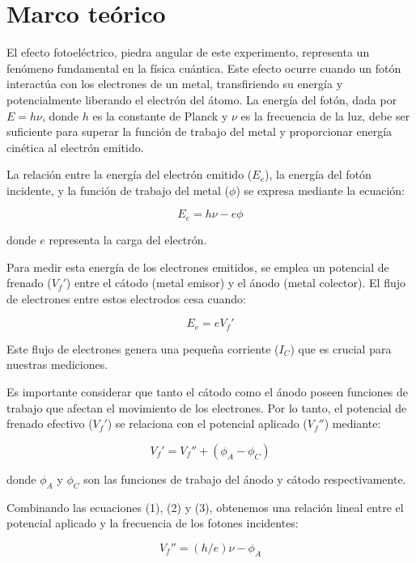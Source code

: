 \documentclass[twocolumn,a4paper,11pt]{scrartcl}
\begin{document}
\section{Marco teórico}

El efecto fotoeléctrico, piedra angular de este experimento, representa un fenómeno fundamental en la física cuántica. Este efecto ocurre cuando un fotón interactúa con los electrones de un metal, transfiriendo su energía y potencialmente liberando el electrón del átomo. La energía del fotón, dada por $E = h\nu$, donde $h$ es la constante de Planck y $\nu$ es la frecuencia de la luz, debe ser suficiente para superar la función de trabajo del metal y proporcionar energía cinética al electrón emitido.

La relación entre la energía del electrón emitido ($E_e$), la energía del fotón incidente, y la función de trabajo del metal ($\phi$) se expresa mediante la ecuación:

\begin{equation}
E_e = h\nu - e\phi
\end{equation}

donde $e$ representa la carga del electrón.

Para medir esta energía de los electrones emitidos, se emplea un potencial de frenado ($V_f'$) entre el cátodo (metal emisor) y el ánodo (metal colector). El flujo de electrones entre estos electrodos cesa cuando:

\begin{equation}
E_e = eV_f'
\end{equation}

Este flujo de electrones genera una pequeña corriente ($I_C$) que es crucial para nuestras mediciones.

Es importante considerar que tanto el cátodo como el ánodo poseen funciones de trabajo que afectan el movimiento de los electrones. Por lo tanto, el potencial de frenado efectivo ($V_f'$) se relaciona con el potencial aplicado ($V_f''$) mediante:

\begin{equation}
V_f' = V_f'' + (\phi_A - \phi_C)
\end{equation}

donde $\phi_A$ y $\phi_C$ son las funciones de trabajo del ánodo y cátodo respectivamente.

Combinando las ecuaciones (1), (2) y (3), obtenemos una relación lineal entre el potencial aplicado y la frecuencia de los fotones incidentes:

\begin{equation}
V_f'' = (h/e)\nu - \phi_A
\end{equation}
\end{document}
